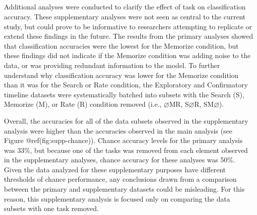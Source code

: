 \clearpage
\makeatletter
\efloat@restorefloats
\makeatother


\begin{appendix}
\hypertarget{section}{%
\section{}\label{section}}

Additional analyses were conducted to clarify the effect of task on
classification accuracy. These supplementary analyses were not seen as
central to the current study, but could prove to be informative to
researchers attempting to replicate or extend these findings in the
future. The results from the primary analyses showed that classification
accuracies were the lowest for the Memorize condition, but these
findings did not indicate if the Memorize condition was adding noise to
the data, or was providing redundant information to the model. To
further understand why classification accuracy was lower for the
Memorize condition than it was for the Search or Rate condition, the
Exploratory and Confirmatory timeline datasets were systematically
batched into subsets with the Search (S), Memorize (M), or Rate (R)
condition removed (i.e., \(\varnothing\)MR, S\(\varnothing\)R,
SM\(\varnothing\)).

Overall, the accuracies for all of the data subsets observed in the
supplementary analysis were higher than the accuracies observed in the
main analysis (see Figure @ref(fig:supp-chance)). Chance accuracy levels
for the primary analysis was 33\%, but because one of the tasks was
removed from each element observed in the supplementary analyses, chance
accuracy for these analyses was 50\%. Given the data analyzed for these
supplementary purposes have different thresholds of chance performance,
any conclusions drawn from a comparison between the primary and
supplementary datasets could be misleading. For this reason, this
supplementary analysis is focused only on comparing the data subsets
with one task removed.


\end{appendix}
